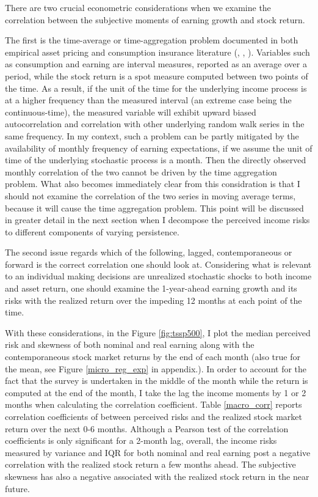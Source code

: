 \documentclass[12pt,notitlepage,onecolumn,aps,pra]{article}
\begin{document}
There are two crucial econometric considerations when we examine the
correlation between the subjective moments of earning growth and stock
return.

The first is the time-average or time-aggregation problem documented in
both empirical asset pricing and consumption insurance literature
(\cite{working_note_1960}, \cite{jagannathan_lazy_2007},
\cite{crawley_search_2019}). Variables such as consumption and earning
are interval measures, reported as an average over a period, while the
stock return is a spot measure computed between two points of the time.
As a result, if the unit of the time for the underlying income process
is at a higher frequency than the measured interval (an extreme case
being the continuous-time), the measured variable will exhibit upward
biased autocorrelation and correlation with other underlying random walk
series in the same frequency. In my context, such a problem can be
partly mitigated by the availability of monthly frequency of earning
expectations, if we assume the unit of time of the underlying stochastic
process is a month. Then the directly observed monthly correlation of
the two cannot be driven by the time aggregation problem. What also
becomes immediately clear from this considration is that I should not
examine the correlation of the two series in moving average terms,
because it will cause the time aggregation problem. This point will be
discussed in greater detail in the next section when I decompose the
perceived income risks to different components of varying persistence.

The second issue regards which of the following, lagged, contemporaneous
or forward is the correct correlation one should look at. Considering
what is relevant to an individual making decisions are unrealized
stochastic shocks to both income and asset return, one should examine
the 1-year-ahead earning growth and its risks with the realized return
over the impeding 12 months at each point of the time.

With these considerations, in the Figure \ref{fig:tssp500}, I plot the
median perceived risk and skewness of both nominal and real earning
along with the contemporaneous stock market returns by the end of each
month (also true for the mean, see Figure \ref{micro_reg_exp} in
appendix.). In order to account for the fact that the survey is
undertaken in the middle of the month while the return is computed at
the end of the month, I take the lag the income moments by 1 or 2 months
when calculating the correlation coefficient. Table \ref{macro_corr}
reports correlation coefficients of between perceived risks and the
realized stock market return over the next 0-6 months. Although a
Pearson test of the correlation coefficients is only significant for a
2-month lag, overall, the income risks measured by variance and IQR for
both nominal and real earning post a negative correlation with the
realized stock return a few months ahead. The subjective skewness has
also a negative associated with the realized stock return in the near
future.
\end{document}
